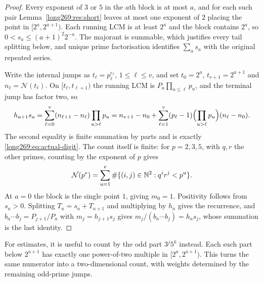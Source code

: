 \documentclass[11pt]{article}
\theoremstyle{remark}
\theoremstyle{plain}
\begin{document}
\begin{proof}
Every exponent of $3$ or $5$ in the $a$th block is at most $a$, and for each
such pair Lemma~\ref{long269:res:short} leaves at most one exponent of $2$ placing the
point in $[2^{a},2^{a+1})$.  Each running LCM is at least $2^{a}$ and the block
contains $2^{a}$, so $0<s_a\le(a+1)^{2}2^{-a}$.  The majorant is summable,
which justifies every tail splitting below, and unique prime factorisation
identifies $\sum_a s_a$ with the original repeated series.

Write the internal jumps as $t_\ell=p_\ell^{e_\ell}$, $1\le\ell\le v$, and set
$t_0=2^{a}$, $t_{v+1}=2^{a+1}$ and $n_\ell=\mathcal N(t_\ell)$.
On $[t_\ell,t_{\ell+1})$ the
running LCM is $P_a\prod_{u\le\ell}p_u$, and the terminal jump has factor two, so
\[
 h_{a+1}s_a
 =\sum_{\ell=0}^{v}(n_{\ell+1}-n_\ell)\prod_{u>\ell}p_u
 =n_{v+1}-n_0+\sum_{\ell=1}^{v}(p_\ell-1)
        \Bigl(\prod_{u>\ell}p_u\Bigr)(n_\ell-n_0).
\]
The second equality is finite summation by parts and is exactly
\eqref{long269:eq:actual-digit}.  The count itself is finite: for $p=2,3,5$,
with $q,r$ the other primes, counting by the exponent of $p$ gives
\[
 \mathcal N(p^e)=\sum_{u=1}^e\#\{(i,j)\in\mathbb{N}^2:q^ir^j<p^u\}.
\]
At $a=0$ the block is the single point $1$, giving $m_0=1$.  Positivity follows from $s_a>0$.  Splitting $T_a=s_a+T_{a+1}$ and
multiplying by $h_a$ gives the recurrence, and
$b_a\cdots b_j=P_{j+1}/P_a$ with $m_j=h_{j+1}s_j$ gives
$m_j/(b_a\cdots b_j)=h_as_j$, whose summation is the last identity.
\end{proof}

For estimates, it is useful to count by the odd part $3^j5^k$ instead.
Each such part below $2^{a+1}$ has exactly one power-of-two multiple in
$[2^a,2^{a+1})$.  This turns the same numerator into a two-dimensional
count, with weights determined by the remaining odd-prime jumps.
\end{document}
